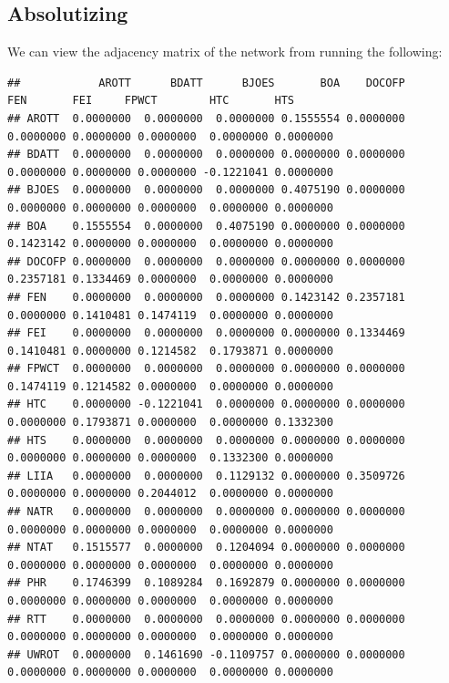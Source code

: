\documentclass[
]{book}
\newenvironment{Shaded}{\begin{snugshade}}{\end{snugshade}}
\newcommand{\NormalTok}[1]{#1}
\newcommand{\SpecialCharTok}[1]{\textcolor[rgb]{0.81,0.36,0.00}{\textbf{#1}}}
\begin{document}
\subsection{Absolutizing}\label{absolutizing}

We can view the adjacency matrix of the network from running the following:

\begin{Shaded}
\end{Shaded}

\begin{verbatim}
##            AROTT      BDATT      BJOES       BOA    DOCOFP       FEN       FEI     FPWCT        HTC       HTS
## AROTT  0.0000000  0.0000000  0.0000000 0.1555554 0.0000000 0.0000000 0.0000000 0.0000000  0.0000000 0.0000000
## BDATT  0.0000000  0.0000000  0.0000000 0.0000000 0.0000000 0.0000000 0.0000000 0.0000000 -0.1221041 0.0000000
## BJOES  0.0000000  0.0000000  0.0000000 0.4075190 0.0000000 0.0000000 0.0000000 0.0000000  0.0000000 0.0000000
## BOA    0.1555554  0.0000000  0.4075190 0.0000000 0.0000000 0.1423142 0.0000000 0.0000000  0.0000000 0.0000000
## DOCOFP 0.0000000  0.0000000  0.0000000 0.0000000 0.0000000 0.2357181 0.1334469 0.0000000  0.0000000 0.0000000
## FEN    0.0000000  0.0000000  0.0000000 0.1423142 0.2357181 0.0000000 0.1410481 0.1474119  0.0000000 0.0000000
## FEI    0.0000000  0.0000000  0.0000000 0.0000000 0.1334469 0.1410481 0.0000000 0.1214582  0.1793871 0.0000000
## FPWCT  0.0000000  0.0000000  0.0000000 0.0000000 0.0000000 0.1474119 0.1214582 0.0000000  0.0000000 0.0000000
## HTC    0.0000000 -0.1221041  0.0000000 0.0000000 0.0000000 0.0000000 0.1793871 0.0000000  0.0000000 0.1332300
## HTS    0.0000000  0.0000000  0.0000000 0.0000000 0.0000000 0.0000000 0.0000000 0.0000000  0.1332300 0.0000000
## LIIA   0.0000000  0.0000000  0.1129132 0.0000000 0.3509726 0.0000000 0.0000000 0.2044012  0.0000000 0.0000000
## NATR   0.0000000  0.0000000  0.0000000 0.0000000 0.0000000 0.0000000 0.0000000 0.0000000  0.0000000 0.0000000
## NTAT   0.1515577  0.0000000  0.1204094 0.0000000 0.0000000 0.0000000 0.0000000 0.0000000  0.0000000 0.0000000
## PHR    0.1746399  0.1089284  0.1692879 0.0000000 0.0000000 0.0000000 0.0000000 0.0000000  0.0000000 0.0000000
## RTT    0.0000000  0.0000000  0.0000000 0.0000000 0.0000000 0.0000000 0.0000000 0.0000000  0.0000000 0.0000000
## UWROT  0.0000000  0.1461690 -0.1109757 0.0000000 0.0000000 0.0000000 0.0000000 0.0000000  0.0000000 0.0000000

\end{verbatim}
\end{document}
